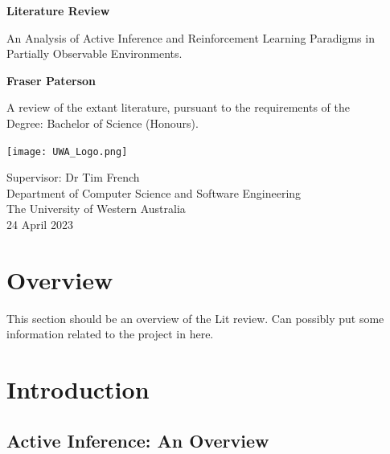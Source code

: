\documentclass[onecolumn]{IEEEtran}
\begin{document}
\begin{titlepage}
	\begin{center}
	
	\vspace*{0.5cm}
	
	\Huge
	\textbf{Literature Review}
	
	\vspace{0.5cm}
	\Large
	An Analysis of Active Inference and Reinforcement Learning Paradigms in Partially Observable Environments.
	
	\vspace{1.5cm}

	\textbf{Fraser Paterson}

	\vspace{1.5cm}

	A review of the extant literature, pursuant to the requirements of the\\ 
	Degree: Bachelor of Science (Honours).  
	
	\vspace{2.0cm}

	\texttt{[image: UWA\_Logo.png]}
	
	\vspace{2.0cm}	
	
	\Large
	Supervisor: Dr Tim French\\ 
	Department of Computer Science and Software Engineering\\
	The University of Western Australia\\
	24 April 2023
	\end{center}
\end{titlepage}


\tableofcontents

\cleardoublepage

\section{Overview}
This section should be an overview of the Lit review. Can possibly put some information related to the project in here.

\section{Introduction}

\subsection{Active Inference: An Overview}
\end{document}
